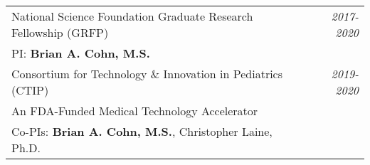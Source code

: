 \documentclass[10pt,a4paper]{article}
\begin{document}
  \vspace*{1mm}\noindent\begin{tabularx}{17cm}{X r}
    National Science Foundation Graduate Research Fellowship (GRFP) & \textit{2017-2020} \\
    PI: \textbf{Brian A. Cohn, M.S.} \\
    \vspace*{1mm}
    Consortium for Technology \& Innovation in Pediatrics (CTIP) & \textit{2019-2020} \\
    An FDA-Funded Medical Technology Accelerator\\
    Co-PIs: \textbf{Brian A. Cohn, M.S.}, Christopher Laine, Ph.D. \\


  

\end{tabularx}
\end{document}
